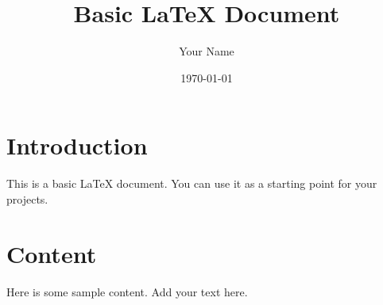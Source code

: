 \documentclass{article}
\title{Basic LaTeX Document}
\author{Your Name}
\date{\today}
\begin{document}
\maketitle

\section{Introduction}
This is a basic LaTeX document. You can use it as a starting point for your projects.

\section{Content}
Here is some sample content. Add your text here.
\end{document}
